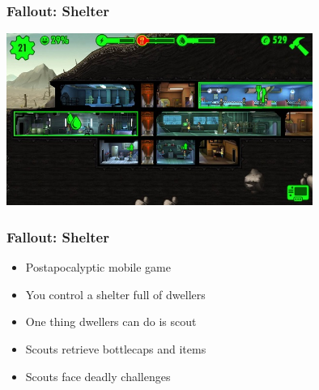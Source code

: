\documentclass{beamer}
\begin{document}
\begin{frame}
  \frametitle{Fallout: Shelter}
  \includegraphics[width=10cm]{Fallout_Shelter_gameplay}
\end{frame}

\begin{frame}
  \frametitle{Fallout: Shelter}
  \begin{itemize}
  \item Postapocalyptic mobile game
  \item You control a shelter full of dwellers
  \item One thing dwellers can do is scout
  \item Scouts retrieve bottlecaps and items
  \item Scouts face deadly challenges
  \end{itemize}
\end{frame}
\end{document}
